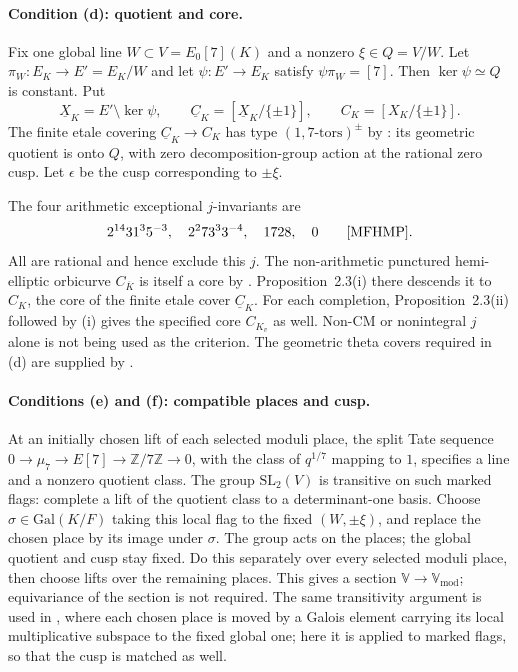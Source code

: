 \documentclass[11pt]{article}
\theoremstyle{plain}
\theoremstyle{definition}
\newcommand{\Vmod}{\mathbb{V}_{\mathrm{mod}}}
\newcommand{\VV}{\mathbb{V}}
\begin{document}
\paragraph{Condition (d): quotient and core.}
Fix one global line $W\subset V=E_0[7](K)$ and a nonzero
$\xi\in Q=V/W$.  Let $\pi_W:E_K\to E'=E_K/W$ and let
$\psi:E'\to E_K$ satisfy $\psi\pi_W=[7]$.  Then
$\ker\psi\simeq Q$ is constant.  Put
\[
 \underline X_K=E'\setminus\ker\psi,\qquad
 \underline C_K=[\underline X_K/\{\pm1\}],\qquad
 C_K=[X_K/\{\pm1\}].
\]
The finite etale covering $\underline C_K\to C_K$ has type
$(1,7\text{-tors})^\pm$ by \cite[Def.~2.1]{EtTh}: its geometric quotient
is onto $Q$, with zero decomposition-group action at the rational zero
cusp.  Let $\epsilon$ be the cusp corresponding to $\pm\xi$.

The four arithmetic exceptional $j$-invariants are
\[
 2^{14}31^3 5^{-3},\quad 2^2 73^3 3^{-4},\quad1728,\quad0
 \qquad\text{\cite[Prop.~2.1]{MFHMP}}.
\]
All are rational and hence exclude this $j$.  The non-arithmetic
punctured hemi-elliptic orbicurve $C_{\overline K}$ is itself a core by
\cite[Prop.~2.7]{CanLift}.  Proposition~2.3(i) there descends it to
$C_K$, the core of the finite etale cover $\underline C_K$.
For each completion, Proposition~2.3(ii) followed by (i) gives the
specified core $C_{K_v}$ as well.  Non-CM or nonintegral $j$ alone is not
being used as the criterion.  The geometric theta covers required in
(d) are supplied by \cite[Prop.~2.2, Def.~2.3]{EtTh}.

\paragraph{Conditions (e) and (f): compatible places and cusp.}
At an initially chosen lift of each selected moduli place, the split Tate
sequence $0\to\mu_7\to E[7]\to\mathbb Z/7\mathbb Z\to0$, with the
class of $q^{1/7}$ mapping to $1$, specifies a line and a nonzero quotient
class.  The group $\mathrm{SL}_2(V)$ is transitive on such marked flags:
complete a lift of the quotient class to a determinant-one basis.
Choose $\sigma\in\mathrm{Gal}(K/F)$ taking this local flag to the fixed
$(W,\pm\xi)$, and replace the chosen place by its image under $\sigma$.
The group acts on the places; the global quotient and cusp stay fixed.
Do this separately over every selected moduli place, then choose lifts
over the remaining places.  This gives a section $\VV\to\Vmod$;
equivariance of the section is not required.  The same transitivity
argument is used in \cite[Lemma~2.9.2]{DH25}, where each chosen place is
moved by a Galois element carrying its local multiplicative subspace to the
fixed global one; here it is applied to marked flags, so that the cusp is
matched as well.
\end{document}
